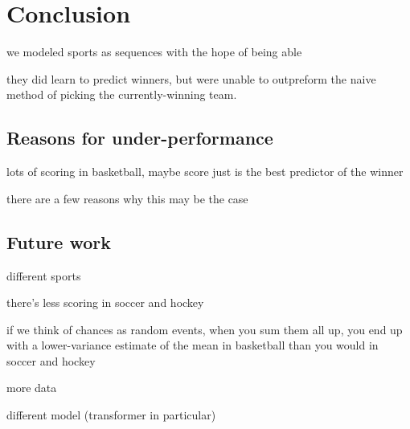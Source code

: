 \section{Conclusion}

we modeled sports as sequences with the hope of being able

they did learn to predict winners, but were unable to outpreform the naive method of picking the currently-winning team.

\subsection{Reasons for under-performance}

lots of scoring in basketball, maybe score just is the best predictor of the winner

there are a few reasons why this may be the case

\subsection{Future work}

different sports

there's less scoring in soccer and hockey

if we think of chances as random events, when you sum them all up, you end up with a lower-variance estimate of the mean in basketball than you would in soccer and hockey

more data

different model (transformer in particular)
